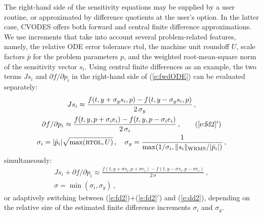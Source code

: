 The right-hand side of the sensitivity equations may be supplied by a
user routine, or approximated by difference quotients at the user's option.
In the latter case, CVODES offers both forward and central finite
difference approximations.
%
We use increments that take into account several problem-related features,
namely, the relative ODE error tolerance {\sc rtol},
the machine unit roundoff $U$,
scale factors $\bar p$ for the problem parameters $p$,
and the weighted root-mean-square norm of the sensitivity vector $s_i$.
%
Using central finite differences as an example, the two terms $J s_i$
and ${\partial f}/{\partial p_i}$ in the right-hand side of (\ref{e:fwdODE})
can be evaluated separately:
\begin{gather}
  J s_i \approx \frac{f(t, y+\sigma_y s_i, p)-
    f(t, y-\sigma_y s_i, p)}{2\,\sigma_y} \, , \label{e:fd2} \\
  {\partial f}/{\partial p_i} \approx \frac{f(t,y,p + \sigma_i e_i)-
    f(t,y,p - \sigma_i e_i)}{2\,\sigma_i} \, , \tag{\ref{e:fd2}$'$} \\
  \sigma_i = |{\bar p}_i| \sqrt{\max(\mbox{\sc rtol}, U)} \, , \quad
  \sigma_y = \frac{1}{\max(1/\sigma_i, \|s_i\|_{\mbox{\scriptsize WRMS}} / |{\bar p}_i|)} \, , \nonumber
\end{gather}
simultaneously:
\begin{gather}
  J s_i + {\partial f}/{\partial p_i} \approx
  \frac{f(t, y+\sigma s_i, p + \sigma e_i) -
    f(t, y-\sigma s_i, p - \sigma e_i)}{2\,\sigma} \, , \label{e:dd2} \\
  \sigma = \min(\sigma_i, \sigma_y) \, , \nonumber
\end{gather}
or adaptively switching between (\ref{e:fd2})+(\ref{e:fd2}$'$) and (\ref{e:dd2}),
depending on the relative size of the estimated finite difference
increments $\sigma_i$ and $\sigma_y$.

